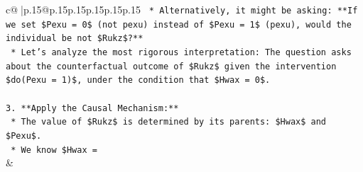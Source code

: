 \documentclass{article}
\begin{document}
{\begin{supertabular}{c@{$\;$}|p{.15\linewidth}@{}p{.15\linewidth}p{.15\linewidth}p{.15\linewidth}p{.15\linewidth}p{.15\linewidth}}
{{{\texttt{    *   Alternatively, it might be asking: **If we set \$Pexu = 0\$ (not pexu) instead of \$Pexu = 1\$ (pexu), would the individual be not \$Rukz\$?**} \\
\texttt{    *   Let's analyze the most rigorous interpretation: The question asks about the counterfactual outcome of \$Rukz\$ given the intervention \$do(Pexu = 1)\$, under the condition that \$Hwax = 0\$.} \\
\\ 
\texttt{3.  **Apply the Causal Mechanism:**} \\
\texttt{    *   The value of \$Rukz\$ is determined by its parents: \$Hwax\$ and \$Pexu\$.} \\
\texttt{    *   We know \$Hwax =} \\
            }
        }
    }
    & \\ \\


\end{supertabular}}
\end{document}

